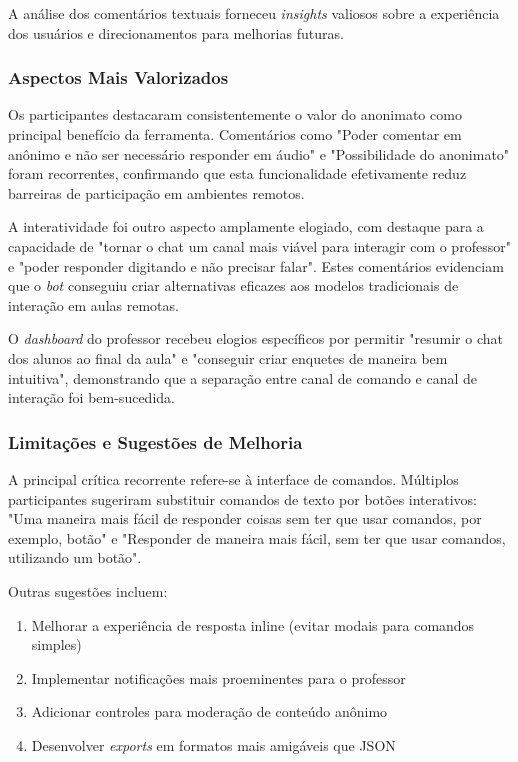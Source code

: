 A análise dos comentários textuais forneceu \textit{insights} valiosos sobre a
experiência dos usuários e direcionamentos para melhorias futuras.

\subsubsection{Aspectos Mais Valorizados}

Os participantes destacaram consistentemente o valor do anonimato como principal
benefício da ferramenta. Comentários como "Poder comentar em anônimo e não ser
necessário responder em áudio" e "Possibilidade do anonimato" foram recorrentes,
confirmando que esta funcionalidade efetivamente reduz barreiras de participação
em ambientes remotos.

A interatividade foi outro aspecto amplamente elogiado, com destaque para a
capacidade de "tornar o chat um canal mais viável para interagir com o
professor" e "poder responder digitando e não precisar falar". Estes comentários
evidenciam que o \textit{bot} conseguiu criar alternativas eficazes aos modelos
tradicionais de interação em aulas remotas.

O \textit{dashboard} do professor recebeu elogios específicos por permitir
"resumir o chat dos alunos ao final da aula" e "conseguir criar enquetes de
maneira bem intuitiva", demonstrando que a separação entre canal de comando e
canal de interação foi bem-sucedida.

\subsubsection{Limitações e Sugestões de Melhoria}

A principal crítica recorrente refere-se à interface de comandos. Múltiplos
participantes sugeriram substituir comandos de texto por botões interativos:
"Uma maneira mais fácil de responder coisas sem ter que usar comandos, por
exemplo, botão" e "Responder de maneira mais fácil, sem ter que usar comandos,
utilizando um botão".

Outras sugestões incluem:
\begin{enumerate}
\item Melhorar a experiência de resposta inline (evitar modais para comandos
simples)
\item Implementar notificações mais proeminentes para o professor
\item Adicionar controles para moderação de conteúdo anônimo
\item Desenvolver \textit{exports} em formatos mais amigáveis que JSON
\end{enumerate}

